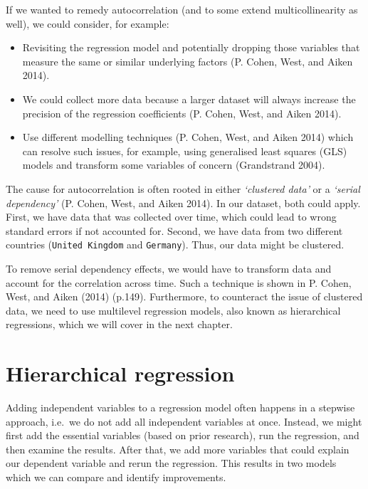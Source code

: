 \documentclass[
  letterpaper,
]{krantz}
\begin{document}
If we wanted to remedy autocorrelation (and to some extend
multicollinearity as well), we could consider, for example:

\begin{itemize}
\item
  Revisiting the regression model and potentially dropping those
  variables that measure the same or similar underlying factors (P.
  Cohen, West, and Aiken 2014).
\item
  We could collect more data because a larger dataset will always
  increase the precision of the regression coefficients (P. Cohen, West,
  and Aiken 2014).
\item
  Use different modelling techniques (P. Cohen, West, and Aiken 2014)
  which can resolve such issues, for example, using generalised least
  squares (GLS) models and transform some variables of concern
  (Grandstrand 2004).
\end{itemize}

The cause for autocorrelation is often rooted in either \emph{`clustered
data'} or a \emph{`serial dependency'} (P. Cohen, West, and Aiken 2014).
In our dataset, both could apply. First, we have data that was collected
over time, which could lead to wrong standard errors if not accounted
for. Second, we have data from two different countries
(\texttt{United\ Kingdom} and \texttt{Germany}). Thus, our data might be
clustered.

To remove serial dependency effects, we would have to transform data and
account for the correlation across time. Such a technique is shown in P.
Cohen, West, and Aiken (2014) (p.149). Furthermore, to counteract the
issue of clustered data, we need to use multilevel regression models,
also known as hierarchical regressions, which we will cover in the next
chapter.

\section{Hierarchical regression}\label{sec-hierarchical-regression}

Adding independent variables to a regression model often happens in a
stepwise approach, i.e.~we do not add all independent variables at once.
Instead, we might first add the essential variables (based on prior
research), run the regression, and then examine the results. After that,
we add more variables that could explain our dependent variable and
rerun the regression. This results in two models which we can compare
and identify improvements.
\end{document}
